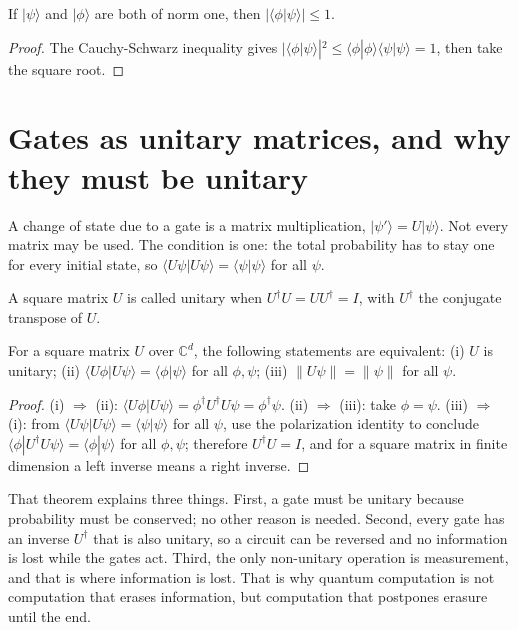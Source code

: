 \begin{proposisi}
If $|\psi\rangle$ and $|\phi\rangle$ are both of norm one, then
$|\langle\phi|\psi\rangle|\le 1$.
\end{proposisi}

\begin{proof}
The Cauchy-Schwarz inequality gives
$|\langle\phi|\psi\rangle|^2\le\langle\phi|\phi\rangle\langle\psi|\psi\rangle=1$, then
take the square root.
\end{proof}

\section{Gates as unitary matrices, and why they must be unitary}

A change of state due to a gate is a matrix multiplication,
$|\psi'\rangle=U|\psi\rangle$. Not every matrix may be used. The condition is one: the
total probability has to stay one for every initial state, so
$\langle U\psi|U\psi\rangle=\langle\psi|\psi\rangle$ for all $\psi$.

\begin{definisi}
A square matrix $U$ is called unitary when $U^{\dagger}U=UU^{\dagger}=I$, with
$U^{\dagger}$ the conjugate transpose of $U$.
\end{definisi}

\begin{teorema}
For a square matrix $U$ over $\mathbb{C}^{d}$, the following statements are equivalent:
(i) $U$ is unitary; (ii) $\langle U\phi|U\psi\rangle=\langle\phi|\psi\rangle$ for all
$\phi,\psi$; (iii) $\|U\psi\|=\|\psi\|$ for all $\psi$.
\end{teorema}

\begin{proof}
(i) $\Rightarrow$ (ii): $\langle U\phi|U\psi\rangle=\phi^{\dagger}U^{\dagger}U\psi
=\phi^{\dagger}\psi$. (ii) $\Rightarrow$ (iii): take $\phi=\psi$. (iii)
$\Rightarrow$ (i): from $\langle U\psi|U\psi\rangle=\langle\psi|\psi\rangle$ for all
$\psi$, use the polarization identity to conclude
$\langle\phi|U^{\dagger}U\psi\rangle=\langle\phi|\psi\rangle$ for all $\phi,\psi$;
therefore $U^{\dagger}U=I$, and for a square matrix in finite dimension a left inverse
means a right inverse.
\end{proof}

That theorem explains three things. First, a gate must be unitary because probability must
be conserved; no other reason is needed. Second, every gate has an inverse $U^{\dagger}$
that is also unitary, so a circuit can be reversed and no information is lost while the
gates act. Third, the only non-unitary operation is measurement, and that is where
information is lost. That is why quantum computation is not computation that erases
information, but computation that postpones erasure until the end.

